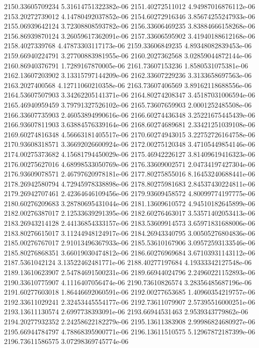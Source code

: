 {2150.33605709234 5.31614751322382e-06
2151.40272511012 4.94987016876112e-06
2153.20272739012 4.14780492037852e-06
2154.60272916346 3.85674255247933e-06
2155.06939642124 3.72308808593782e-06
2156.33606469235 3.83884666158268e-06
2156.86939870124 3.26059617362091e-06
2157.33606595902 3.41940188612168e-06
2158.4027339768 4.47873303117173e-06
2159.33606849235 4.89348082839453e-06
2159.66940224791 3.27700883981955e-06
2160.2027362568 3.02859044872144e-06
2160.86940376791 1.7289167870005e-06
2161.73607153236 1.8580531075381e-06
2162.13607203902 3.13315797144209e-06
2162.33607229236 3.3133658697563e-06
2163.2027400568 4.12711060210358e-06
2163.73607406569 3.89162118688556e-06
2164.53607507903 3.34262205141371e-06
2164.80274208347 3.45187031006594e-06
2165.46940959459 3.79791327526102e-06
2165.73607659903 2.0001252485508e-06
2166.33607735903 2.46053894990616e-06
2166.60274436348 3.25221675445439e-06
2166.93607811903 3.63884576339164e-06
2168.60274689681 2.33421251039108e-06
2169.60274816348 4.56663181405517e-06
2170.60274943015 3.22752726164758e-06
2170.93608318571 3.36692026600924e-06
2172.00275120348 3.47105449854146e-06
2174.00275373682 4.15681794450029e-06
2175.46942226127 3.81409619416323e-06
2176.00275627016 4.68998533050769e-06
2176.33609002571 2.04734197427304e-06
2176.93609078571 2.46797620978181e-06
2177.80275855016 8.16453240688441e-06
2178.26942580794 4.72945978338898e-06
2178.80275981683 2.84537430224811e-06
2179.26942707461 2.42364646109456e-06
2179.93609458572 4.80099774197775e-06
2180.60276209683 3.28780695431044e-06
2181.13609610572 4.94510182645899e-06
2182.00276387017 2.12533639291395e-06
2182.60276463017 3.53571402053413e-06
2183.26943214128 2.44136854333157e-06
2183.53609914573 3.65971831688006e-06
2183.80276615017 3.11244948124917e-06
2184.26943340795 3.00505276804836e-06
2185.00276767017 2.91013496367933e-06
2185.53610167906 3.09572593133546e-06
2185.80276868351 3.66019030474812e-06
2186.60276969684 3.67103931143112e-06
2187.5361042124 3.13522462481771e-06
2188.40277197684 4.19333342127548e-06
2189.13610623907 2.54784691500231e-06
2189.66944024796 2.24960221152893e-06
2190.33610775907 4.1116407056474e-06
2190.73610826574 3.28356485687196e-06
2191.60277603018 1.86446692060591e-06
2192.00277653685 1.40960354219757e-06
2192.33611029241 2.32453445554177e-06
2192.73611079907 2.57395516000251e-06
2193.13611130574 2.6997738393091e-06
2193.66944531463 2.9539343779862e-06
2194.20277932352 2.24258622182279e-06
2195.13611383908 2.99986824680927e-06
2195.66944784797 4.78868395900771e-06
2196.13611510575 5.12967872187399e-06
2196.73611586575 3.07298369745774e-06
}
